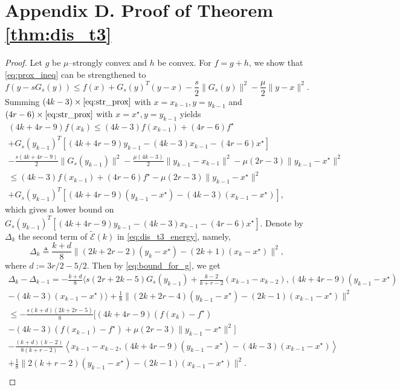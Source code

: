 \documentclass[twoside,11pt]{article}
\begin{document}
\section*{Appendix D. Proof of Theorem \ref{thm:dis_t3}}\label{app:d}
\begin{proof}
Let $g$ be $\mu$--strongly convex and $h$ be convex. For $f = g + h$, we show that \eqref{eq:prox_ineq} can be strengthened to
\begin{equation}\label{eq:str_prox}
f(y-sG_s(y)) \le f(x) + G_s(y)^T(y-x) - \frac{s}{2}\|G_s(y)\|^2 - \frac{\mu}{2}\|y-x\|^2.
\end{equation}
Summing $(4k-3)\times\eqref{eq:str_prox}$ with $x = x_{k-1}, y=y_{k-1}$ and $(4r-6)\times\eqref{eq:str_prox}$ with $x = x^\star, y=y_{k-1}$ yields
\begin{multline}\label{eq:bound_for_g}
(4k+4r-9)f(x_k)\le (4k-3)f(x_{k-1}) + (4r-6)f^\star \\
+ G_s(y_{k-1})^T[(4k+4r-9)y_{k-1} - (4k-3)x_{k-1}-(4r-6)x^\star]\\ - \frac{s(4k+4r-9)}{2}\|G_s(y_{k-1})\|^2 - \frac{\mu(4k-3)}{2}\|y_{k-1}-x_{k-1}\|^2 - \mu(2r-3)\|y_{k-1}-x^\star\|^2\\
\le (4k-3)f(x_{k-1}) + (4r-6)f^\star - \mu(2r-3)\|y_{k-1}-x^\star\|^2\\
+ G_s(y_{k-1})^T\left[ (4k+4r-9)(y_{k-1}-x^\star) 
- (4k-3)(x_{k-1}-x^\star) \right],
\end{multline}
which gives a lower bound on $G_s(y_{k-1})^T \left[ (4k+4r-9)y_{k-1} - (4k-3)x_{k-1}-(4r-6)x^\star \right]$. Denote by $\Delta_k$ the second term of $\tilde{\mathcal{E}}(k)$ in \eqref{eq:dis_t3_energy}, namely, 
\[
\Delta_k \triangleq \frac{k+d}{8}\|(2k+2r-2)(y_k-x^\star) - (2k+1)(x_k-x^\star)\|^2,
\]
where $d := 3r/2-5/2$. Then by \eqref{eq:bound_for_g}, we get
\begin{multline}\nonumber
\Delta_k - \Delta_{k-1} = -\frac{k+d}{8}\Big\langle s(2r+2k-5)G_s(y_{k-1})+\frac{k-2}{k+r-2}(x_{k-1}-x_{k-2}), (4k+4r-9)(y_{k-1}-x^\star) \\
- (4k-3)(x_{k-1}-x^\star) \Big\rangle + \frac{1}{8}\|(2k+2r-4)(y_{k-1}-x^\star) - (2k-1)(x_{k-1}-x^\star)\|^2\\
\le -\frac{s(k+d)(2k+2r-5)}{8} \big[(4k+4r-9)(f(x_k)-f^\star)\\
-(4k-3)(f(x_{k-1})-f^\star) + \mu(2r-3)\|y_{k-1}-x^\star\|^2 \big]\\
-\frac{(k+d)(k-2)}{8(k+r-2)}\left\langle x_{k-1}-x_{k-2}, (4k+4r-9)(y_{k-1}-x^\star)-(4k-3)(x_{k-1}-x^\star) \right\rangle \\+ \frac{1}{8}\|2(k+r-2)(y_{k-1}-x^\star) - (2k-1)(x_{k-1}-x^\star)\|^2.\\

\end{multline}
\end{proof}
\end{document}
